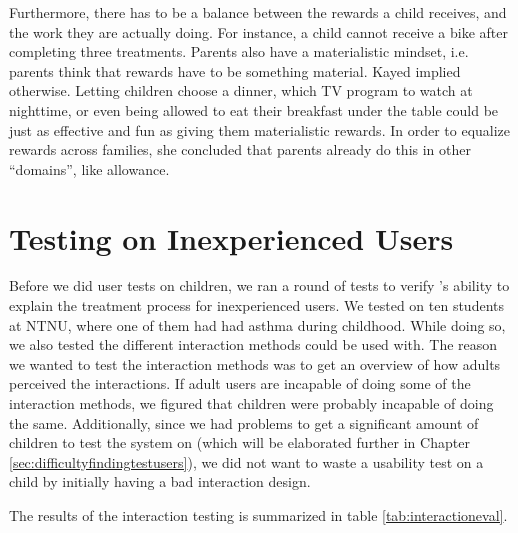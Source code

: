 Furthermore, there has to be a balance between the rewards a child receives, and the work they are actually doing. For instance, a child cannot receive a bike after completing three treatments. Parents also have a materialistic mindset, i.e. parents think that rewards have to be something material. Kayed implied otherwise. Letting children choose a dinner, which TV program to watch at nighttime, or even being allowed to eat their breakfast under the table could be just as effective and fun as giving them materialistic rewards. In order to equalize rewards across families, she concluded that parents already do this in other ``domains'', like allowance.   

\section{Testing \ab{} on Inexperienced Users}
\label{chp:interaction-methods}

Before we did user tests on children, we ran a round of tests to verify \ab{}'s ability to explain the treatment process for inexperienced users. We tested on ten students at NTNU, where one of them had had asthma during childhood. While doing so, we also tested the different interaction methods \ab{} could be used with. The reason we wanted to test the interaction methods was to get an overview of how adults perceived the interactions. If adult users are incapable of doing some of the interaction methods, we figured that children were probably incapable of doing the same. Additionally, since we had problems to get a significant amount of children to test the system on (which will be elaborated further in Chapter \ref{sec:difficultyfindingtestusers}), we did not want to waste a usability test on a child by initially having a bad interaction design.         

The results of the interaction testing is summarized in table \ref{tab:interactioneval}.  

